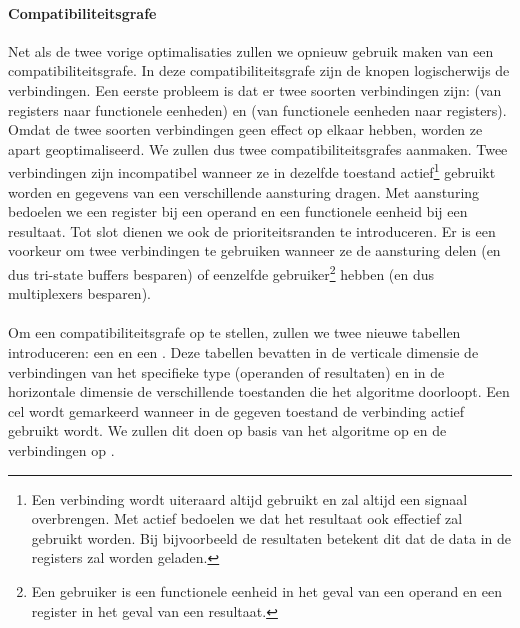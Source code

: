 \paragraph{Compatibiliteitsgrafe}Net als de twee vorige optimalisaties zullen we opnieuw gebruik maken van een compatibiliteitsgrafe. In deze compatibiliteitsgrafe zijn de knopen logischerwijs de verbindingen. Een eerste probleem is dat er twee soorten verbindingen zijn:  (van registers naar functionele eenheden) en  (van functionele eenheden naar registers). Omdat de twee soorten verbindingen geen effect op elkaar hebben, worden ze apart geoptimaliseerd. We zullen dus twee compatibiliteitsgrafes aanmaken. Twee verbindingen zijn incompatibel wanneer ze in dezelfde toestand actief\footnote{Een verbinding wordt uiteraard altijd gebruikt en zal altijd een signaal overbrengen. Met actief bedoelen we dat het resultaat ook effectief zal gebruikt worden. Bij bijvoorbeeld de resultaten betekent dit dat de data in de registers zal worden geladen.} gebruikt worden en gegevens van een verschillende aansturing dragen. Met aansturing bedoelen we een register bij een operand en een functionele eenheid bij een resultaat. Tot slot dienen we ook de prioriteitsranden te introduceren. Er is een voorkeur om twee verbindingen te gebruiken wanneer ze de aansturing delen (en dus tri-state buffers besparen) of eenzelfde gebruiker\footnote{Een gebruiker is een functionele eenheid in het geval van een operand en een register in het geval van een resultaat.} hebben (en dus multiplexers besparen).
\paragraph{}
Om een compatibiliteitsgrafe op te stellen, zullen we twee nieuwe tabellen introduceren: een  en een . Deze tabellen bevatten in de verticale dimensie de verbindingen van het specifieke type (operanden of resultaten) en in de horizontale dimensie de verschillende toestanden die het algoritme doorloopt. Een cel wordt gemarkeerd wanneer in de gegeven toestand de verbinding actief gebruikt wordt. We zullen dit doen op basis van het algoritme op  en de verbindingen op .
